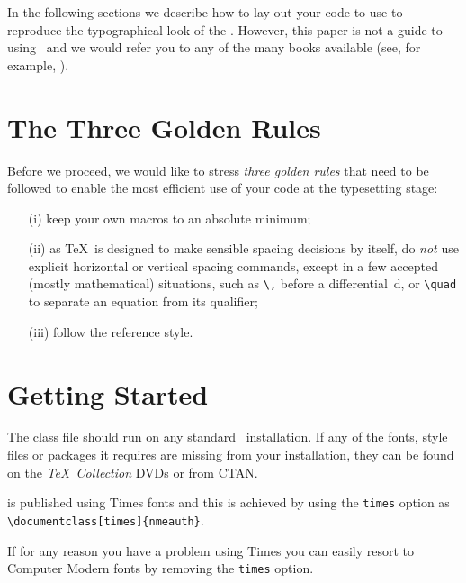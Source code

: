 \documentclass[times]{nmeauth}
\begin{document}
In the following sections we describe how to lay out your code to
use \textsf{\journalclass} to reproduce the typographical look of
the \emph{\journalnamelc}. However, this paper is not a guide to
using \LaTeXe\ and we would refer you to any of the many books
available (see, for example, \cite{R1,R2,R3}).

\vspace{-6pt}

\section{The Three Golden Rules}
\vspace{-2pt}

Before we proceed, we would like to stress \emph{three golden
rules} that need to be followed to enable the most efficient use
of your code at the typesetting stage:
\begin{enumerate}
\item[(i)] keep your own macros to an absolute minimum;

\item[(ii)] as \TeX\ is designed to make sensible spacing
decisions by itself, do \emph{not} use explicit horizontal or
vertical spacing commands, except in a few accepted (mostly
mathematical) situations, such as \verb"\," before a
differential~d, or \verb"\quad" to separate an equation from its
qualifier;

\item[(iii)] follow the \emph{\journalnamelc} reference style.
\end{enumerate}

\pagebreak

\section{Getting Started} The \textsf{\journalclassshort} class file should run
on any standard \LaTeXe\ installation. If any of the fonts, style
files or packages it requires are missing from your installation,
they can be found on the \emph{\TeX\ Collection} DVDs or from
CTAN.

\emph{\journalnamelc} is published using Times fonts and this is
achieved by using the \verb"times"
option as\\
\verb"\documentclass[times]{nmeauth}".

\noindent If for any reason you have a problem using Times you can
easily resort to Computer Modern fonts by removing the
\verb"times" option.
\end{document}

